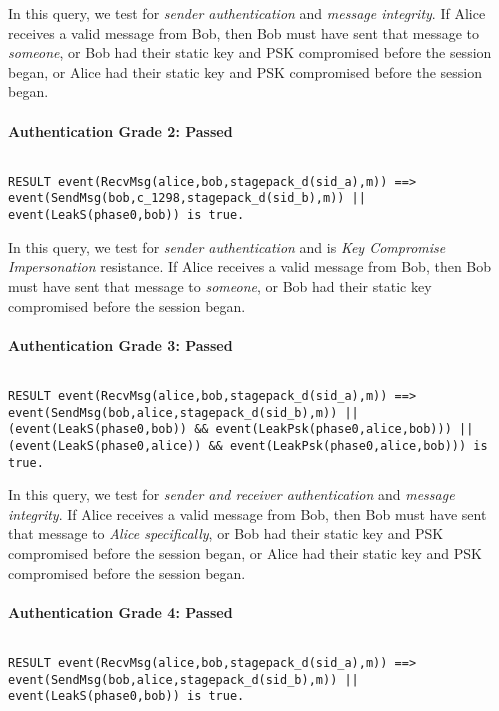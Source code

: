In this query, we test for \emph{sender authentication} and \emph{message integrity}. If Alice receives a valid message from Bob, then Bob must have sent that message to \emph{someone}, or Bob had their static key and PSK compromised before the session began, or Alice had their static key and PSK compromised before the session began.


\paragraph{Authentication Grade 2: Passed}$ $
\begin{lstlisting}
RESULT event(RecvMsg(alice,bob,stagepack_d(sid_a),m)) ==> event(SendMsg(bob,c_1298,stagepack_d(sid_b),m)) || event(LeakS(phase0,bob)) is true.
\end{lstlisting}

In this query, we test for \emph{sender authentication} and is \emph{Key Compromise Impersonation} resistance. If Alice receives a valid message from Bob, then Bob must have sent that message to \emph{someone}, or Bob had their static key compromised before the session began.


\paragraph{Authentication Grade 3: Passed}$ $
\begin{lstlisting}
RESULT event(RecvMsg(alice,bob,stagepack_d(sid_a),m)) ==> event(SendMsg(bob,alice,stagepack_d(sid_b),m)) || (event(LeakS(phase0,bob)) && event(LeakPsk(phase0,alice,bob))) || (event(LeakS(phase0,alice)) && event(LeakPsk(phase0,alice,bob))) is true.
\end{lstlisting}

In this query, we test for \emph{sender and receiver authentication} and \emph{message integrity}. If Alice receives a valid message from Bob, then Bob must have sent that message to \emph{Alice specifically}, or Bob had their static key and PSK compromised before the session began, or Alice had their static key and PSK compromised before the session began.


\paragraph{Authentication Grade 4: Passed}$ $
\begin{lstlisting}
RESULT event(RecvMsg(alice,bob,stagepack_d(sid_a),m)) ==> event(SendMsg(bob,alice,stagepack_d(sid_b),m)) || event(LeakS(phase0,bob)) is true.
\end{lstlisting}

